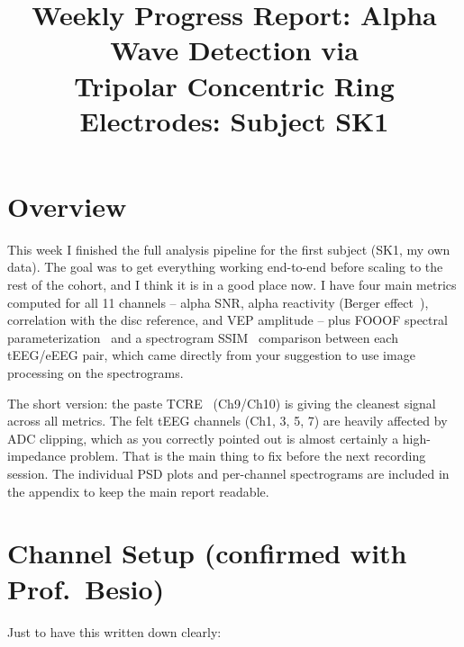 \documentclass[10pt,conference]{IEEEtran}
\begin{document}
\title{Weekly Progress Report: Alpha Wave Detection via\\
Tripolar Concentric Ring Electrodes: Subject SK1}

\author{%
  }

\maketitle

\section{Overview}

This week I finished the full analysis pipeline for the first subject
(SK1, my own data).
The goal was to get everything working end-to-end before scaling to the rest
of the cohort, and I think it is in a good place now.
I have four main metrics computed for all 11 channels -- alpha SNR, alpha
reactivity (Berger effect~\cite{kirschfeld2005}), correlation with the disc reference, and VEP
amplitude -- plus FOOOF spectral parameterization~\cite{donoghue2020}
and a spectrogram SSIM~\cite{wang2004}
comparison between each tEEG/eEEG pair, which came directly from your
suggestion to use image processing on the spectrograms.

The short version: the paste TCRE~\cite{besio2006} (Ch9/Ch10) is giving the cleanest signal
across all metrics.
The felt tEEG channels (Ch1, 3, 5, 7) are heavily affected by ADC clipping,
which as you correctly pointed out is almost certainly a high-impedance
problem.
That is the main thing to fix before the next recording session.
The individual PSD plots and per-channel spectrograms are included in the
appendix to keep the main report readable.

\section{Channel Setup (confirmed with Prof.\ Besio)}

Just to have this written down clearly:
\end{document}
